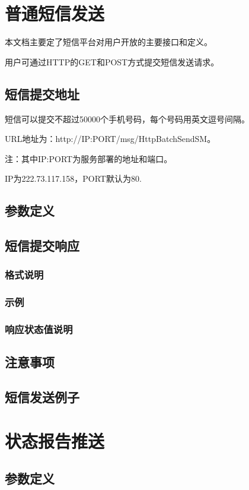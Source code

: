 \documentclass[11pt]{book} %
\begin{document}
\chapter{普通短信发送}


本文档主要定了短信平台对用户开放的主要接口和定义。

用户可通过HTTP的GET和POST方式提交短信发送请求。



\section{短信提交地址}

短信可以提交不超过50000个手机号码，每个号码用英文逗号间隔。

URL地址为：http://IP:PORT/msg/HttpBatchSendSM。

注：其中IP:PORT为服务部署的地址和端口。

IP为222.73.117.158，PORT默认为80.

\section{参数定义}
\section{短信提交响应}
\subsection{格式说明}
\subsection{示例}
\subsection{响应状态值说明}
\section{注意事项}
\section{短信发送例子}
\chapter{状态报告推送}
\section{参数定义}
\end{document}
